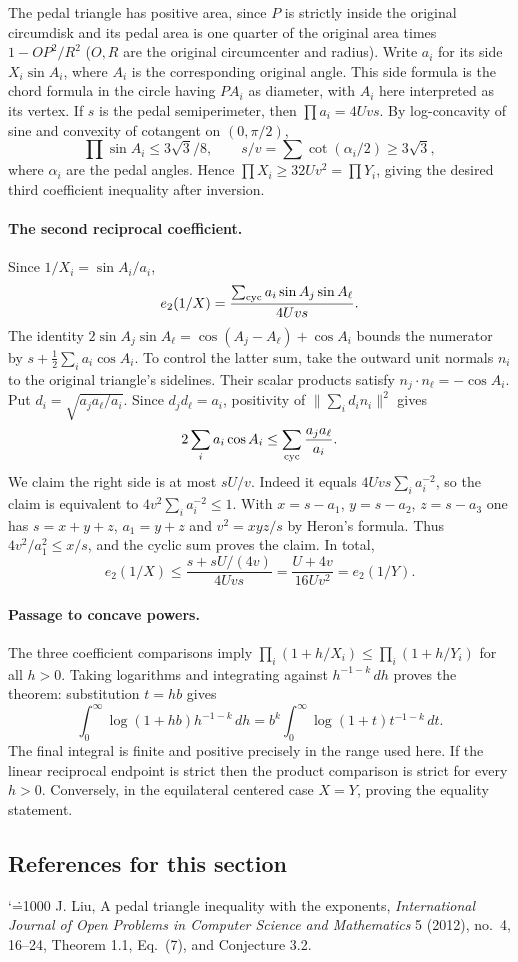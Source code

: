 \documentclass[11pt,a4paper]{article}
\makeatletter
\numberwithin{equation}{section}
\theoremstyle{definition}
\theoremstyle{remark}
\renewenvironment{thebibliography}[1]
 {\subsection*{References for this section}\small
  \list{\@biblabel{\@arabic\c@enumiv}}
       {\settowidth\labelwidth{\@biblabel{#1}}\leftmargin\labelwidth
        \advance\leftmargin\labelsep\@openbib@code
        \usecounter{enumiv}\let\p@enumiv\@empty
        \renewcommand\theenumiv{\@arabic\c@enumiv}}
  \sloppy\clubpenalty4000\widowpenalty4000\sfcode`\.=1000\relax}
 {\def\@noitemerr{\@latex@warning{Empty bibliography}}\endlist}
\makeatother
\begin{document}
The pedal triangle has positive area, since $P$ is strictly inside the original circumdisk and its pedal area is one quarter of the original area times $1-OP^2/R^2$ ($O,R$ are the original circumcenter and radius). Write $a_i$ for its side $X_i\sin A_i$, where $A_i$ is the corresponding original angle. This side formula is the chord formula in the circle having $PA_i$ as diameter, with $A_i$ here interpreted as its vertex. If $s$ is the pedal semiperimeter, then $\prod a_i=4Uvs$. By log-concavity of sine and convexity of cotangent on $(0,\pi/2)$,
\[
 \prod\sin A_i\le 3\sqrt3/8,\qquad
 s/v=\sum\cot(\alpha_i/2)\ge3\sqrt3,
\]
where $\alpha_i$ are the pedal angles. Hence $\prod X_i\ge32Uv^2=\prod Y_i$, giving the desired third coefficient inequality after inversion.

\paragraph{The second reciprocal coefficient.}
Since $1/X_i=\sin A_i/a_i$,
\[
 e_2(1/X)=\frac{\sum_{\rm cyc}a_i\sin A_j\sin A_\ell}{4Uvs}.
\]
The identity $2\sin A_j\sin A_\ell=\cos(A_j-A_\ell)+\cos A_i$ bounds the numerator by $s+\frac12\sum_i a_i\cos A_i$. To control the latter sum, take the outward unit normals $n_i$ to the original triangle's sidelines. Their scalar products satisfy $n_j\cdot n_\ell=-\cos A_i$. Put $d_i=\sqrt{a_ja_\ell/a_i}$. Since $d_jd_\ell=a_i$, positivity of $\|\sum_i d_in_i\|^2$ gives
\[
 2\sum_i a_i\cos A_i\le\sum_{\rm cyc}\frac{a_ja_\ell}{a_i}.
\]
We claim the right side is at most $sU/v$. Indeed it equals $4Uvs\sum_i a_i^{-2}$, so the claim is equivalent to $4v^2\sum_i a_i^{-2}\le1$. With $x=s-a_1$, $y=s-a_2$, $z=s-a_3$ one has $s=x+y+z$, $a_1=y+z$ and $v^2=xyz/s$ by Heron's formula. Thus $4v^2/a_1^2\le x/s$, and the cyclic sum proves the claim. In total,
\[
 e_2(1/X)\le\frac{s+sU/(4v)}{4Uvs}
 =\frac{U+4v}{16Uv^2}=e_2(1/Y).
\]

\paragraph{Passage to concave powers.}
The three coefficient comparisons imply
$\prod_i(1+h/X_i)\le\prod_i(1+h/Y_i)$ for all $h>0$.
Taking logarithms and integrating against $h^{-1-k}\,dh$ proves the theorem: substitution $t=hb$ gives
\[
 \int_0^\infty\log(1+hb)h^{-1-k}\,dh
 = b^k\int_0^\infty\log(1+t)t^{-1-k}\,dt .
\]
The final integral is finite and positive precisely in the range used here. If the linear reciprocal endpoint is strict then the product comparison is strict for every $h>0$. Conversely, in the equilateral centered case $X=Y$, proving the equality statement.
\begin{thebibliography}{1}
 J. Liu, A pedal triangle inequality with the exponents, \textit{International Journal of Open Problems in Computer Science and Mathematics} 5 (2012), no.~4, 16--24, Theorem 1.1, Eq.~(7), and Conjecture 3.2.
\end{thebibliography}
\end{document}
